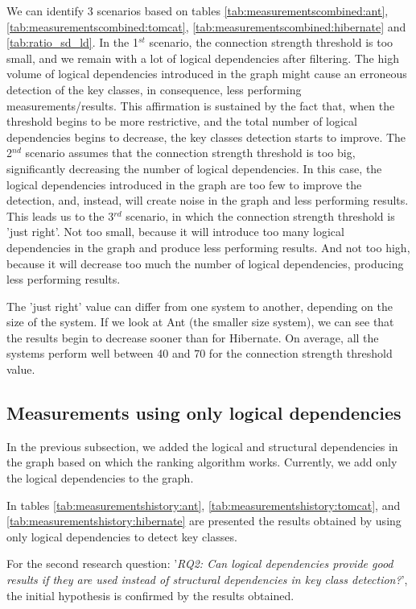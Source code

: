 \documentclass[runningheads]{comsis2}
\begin{document}
We can identify 3 scenarios based on tables \ref{tab:measurementscombined:ant}, \ref{tab:measurementscombined:tomcat}, \ref{tab:measurementscombined:hibernate} and \ref{tab:ratio_sd_ld}. In the 1$^{st}$ scenario, the connection strength threshold is too small, and we remain with a lot of logical dependencies after filtering. The high volume of logical dependencies introduced in the graph might cause an erroneous detection of the key classes, in consequence, less performing measurements/results. This affirmation is sustained by the fact that, when the threshold begins to be more restrictive, and the total number of logical dependencies begins to decrease, the key classes detection starts to improve.
The 2$^{nd}$ scenario assumes that the connection strength threshold is too big, significantly decreasing the number of logical dependencies. In this case, the logical dependencies introduced in the graph are too few to improve the detection, and, instead, will create noise in the graph and less performing results.
This leads us to the 3$^{rd}$ scenario, in which the connection strength threshold is 'just right'. Not too small, because it will introduce too many logical dependencies in the graph and produce less performing results. And not too high, because it will decrease too much the number of logical dependencies, producing less performing results. 

The 'just right' value can differ from one system to another, depending on the size of the system. If we look at Ant (the smaller size system), we can see that the results begin to decrease sooner than for Hibernate. On average, all the systems perform well between 40 and 70 for the connection strength threshold value.




\subsection{Measurements using only logical dependencies}
\label{sec:measure_ld}


In the previous subsection, we added the logical and structural dependencies in the graph based on which the ranking algorithm works. Currently, we add only the logical dependencies to the graph.

In tables \ref{tab:measurementshistory:ant}, \ref{tab:measurementshistory:tomcat}, and \ref{tab:measurementshistory:hibernate} are presented the results obtained by using only logical dependencies to detect key classes.

For the second research question: '\textit{RQ2: Can logical dependencies provide good results if they are used instead of structural dependencies in key class detection?}', the initial hypothesis is confirmed by the results obtained.
\end{document}
